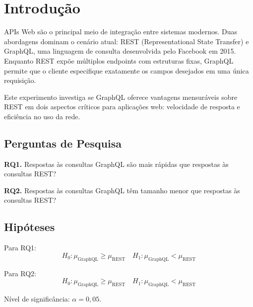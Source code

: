 \section{Introdução}

APIs Web são o principal meio de integração entre sistemas modernos.
Duas abordagens dominam o cenário atual: REST (Representational State Transfer)
e GraphQL, uma linguagem de consulta desenvolvida pelo Facebook em 2015.
Enquanto REST expõe múltiplos endpoints com estruturas fixas, GraphQL permite
que o cliente especifique exatamente os campos desejados em uma única requisição.

Este experimento investiga se GraphQL oferece vantagens mensuráveis sobre REST
em dois aspectos críticos para aplicações web: velocidade de resposta e
eficiência no uso da rede.

\subsection{Perguntas de Pesquisa}

\textbf{RQ1.} Respostas às consultas GraphQL são mais rápidas que respostas às
consultas REST?

\textbf{RQ2.} Respostas às consultas GraphQL têm tamanho menor que respostas
às consultas REST?

\subsection{Hipóteses}

Para RQ1:
\[
H_0: \mu_{\text{GraphQL}} \ge \mu_{\text{REST}} \quad
H_1: \mu_{\text{GraphQL}} < \mu_{\text{REST}}
\]

Para RQ2:
\[
H_0: \mu_{\text{GraphQL}} \ge \mu_{\text{REST}} \quad
H_1: \mu_{\text{GraphQL}} < \mu_{\text{REST}}
\]

Nível de significância: $\alpha = 0,05$.

